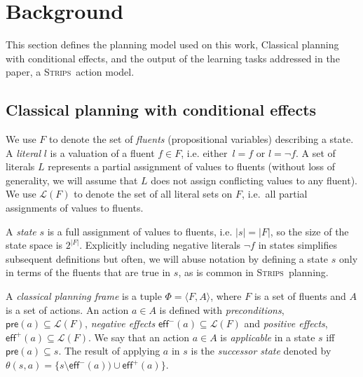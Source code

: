 \documentclass[3p,times]{elsarticle}
\newcommand{\pre}{\mathsf{pre}}  %
\newcommand{\eff}{\mathsf{eff}}  %
\newcommand{\strips}{\textsc{Strips}}     %
\newcommand{\tup}[1]{{\langle #1 \rangle}}
\begin{document}
\section{Background}
\label{sec:Section3}
This section defines the planning model used on this work, Classical planning with conditional effects, and the output of the learning tasks addressed in the paper, a \strips\ action model.

\subsection{Classical planning with conditional effects}
We use $F$ to denote the set of {\em fluents} (propositional variables) describing a state. A {\em literal} $l$ is a valuation of a fluent $f\in F$, i.e. either~$l=f$ or $l=\neg f$. A set of literals $L$ represents a partial assignment of values to fluents (without loss of generality, we will assume that $L$ does not assign conflicting values to any fluent). We use $\mathcal{L}(F)$ to denote the set of all literal sets on $F$, i.e.~all partial assignments of values to fluents.

A {\em state} $s$ is a full assignment of values to fluents, i.e. $|s|=|F|$, so the size of the state space is $2^{|F|}$. Explicitly including negative literals $\neg f$ in states simplifies subsequent definitions but often, we will abuse notation by defining a state $s$ only in terms of the fluents that are true in $s$, as is common in \strips\ planning.

A {\em classical planning frame} is a tuple $\Phi=\tup{F,A}$, where $F$ is a set of fluents and $A$ is a set of actions. An action $a\in A$ is defined with {\em preconditions}, $\pre(a)\subseteq\mathcal{L}(F)$, {\em negative effects} $\eff^-(a)\subseteq\mathcal{L}(F)$ and {\em positive effects}, $\eff^+(a)\subseteq\mathcal{L}(F)$. We say that an action $a\in A$ is {\em applicable} in a state $s$ iff $\pre(a)\subseteq s$. The result of applying $a$ in $s$ is the {\em successor state} denoted by $\theta(s,a)=\{s\setminus\eff^-(a))\cup\eff^+(a)\}$.

\end{document}
